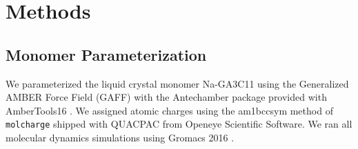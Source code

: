 \documentclass[journal=jpcbfk,manusciprt=article]{achemso}
\begin{document}
% 
%
%
  

  \section{Methods}
 
  \subsection{Monomer Parameterization}

  We parameterized the liquid crystal monomer Na-GA3C11 using the Generalized AMBER
  Force Field (GAFF) \cite{wang_development_2004} with the Antechamber package
  \cite{wang_automatic_2006} provided with AmberTools16
  \cite{case_ambertools16_2016}. We assigned atomic charges using the am1bccsym
  method of \texttt{molcharge} shipped with QUACPAC from Openeye Scientific
  Software. We ran all molecular dynamics simulations using Gromacs 2016
  \cite{bekker_gromacs:_1993,berendsen_gromacs:_1995,van_der_spoel_gromacs:_2005,hess_gromacs_2008}.
\end{document}
